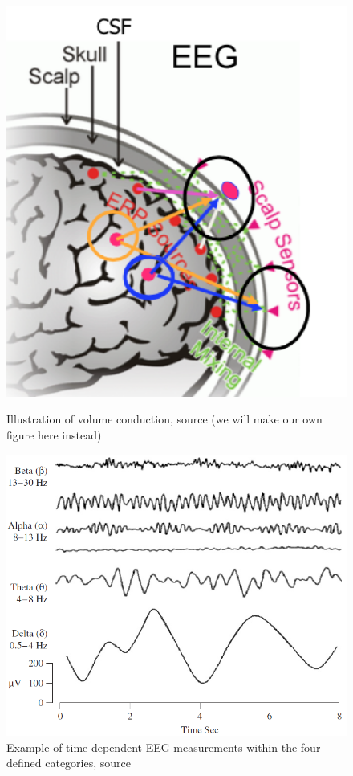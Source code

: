 \begin{figure}[H]
    \begin{minipage}[t]{.45\textwidth}
        \centering
        \includegraphics[width=\textwidth]{figurs/scalp.png}
        \caption{Illustration of volume conduction, source \cite{phd2015}(we will make our own figure here instead)}\label{fig:volumeconduction}
    \end{minipage} 
    \hfill
    \begin{minipage}[t]{.45\textwidth}
        \centering
        \includegraphics[width=\textwidth]{figurs/EEG_example.png}
        \caption{Example of time dependent EEG measurements within the four defined categories, source \cite{EEGsignalprocessing}}\label{fig:EEG_example}
    \end{minipage}
\end{figure}

